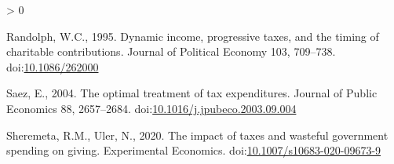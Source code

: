 \documentclass[
]{article}
\newlength{\cslhangindent}
\newenvironment{CSLReferences}[2] %
 {%
  \setlength{\parindent}{0pt}
  \ifodd #1 \everypar{\setlength{\hangindent}{\cslhangindent}}\ignorespaces\fi
  \ifnum #2 > 0
  \setlength{\parskip}{#2\baselineskip}
  \fi
 }%
 {}
\begin{document}
\begin{CSLReferences}{1}{0}
\leavevmode\hypertarget{ref-Randolph1995}{}%
Randolph, W.C., 1995. Dynamic income, progressive taxes, and the timing of charitable contributions. Journal of Political Economy 103, 709--738. doi:\href{https://doi.org/10.1086/262000}{10.1086/262000}

\leavevmode\hypertarget{ref-Saez2004}{}%
Saez, E., 2004. The optimal treatment of tax expenditures. Journal of Public Economics 88, 2657--2684. doi:\href{https://doi.org/10.1016/j.jpubeco.2003.09.004}{10.1016/j.jpubeco.2003.09.004}

\leavevmode\hypertarget{ref-Sheremeta2020}{}%
Sheremeta, R.M., Uler, N., 2020. The impact of taxes and wasteful government spending on giving. Experimental Economics. doi:\href{https://doi.org/10.1007/s10683-020-09673-9}{10.1007/s10683-020-09673-9}

\end{CSLReferences}
\end{document}
